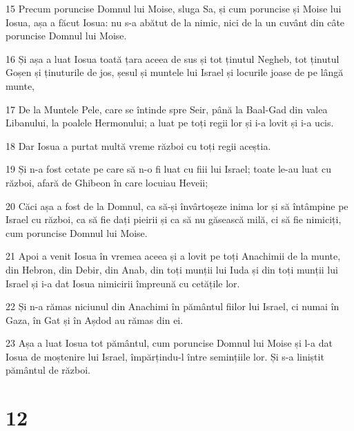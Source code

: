 \par 15 Precum poruncise Domnul lui Moise, sluga Sa, și cum poruncise și Moise lui Iosua, așa a făcut Iosua: nu s-a abătut de la nimic, nici de la un cuvânt din câte poruncise Domnul lui Moise.
\par 16 Și așa a luat Iosua toată țara aceea de sus și tot ținutul Negheb, tot ținutul Goșen și ținuturile de jos, șesul și muntele lui Israel și locurile joase de pe lângă munte,
\par 17 De la Muntele Pele, care se întinde spre Seir, până la Baal-Gad din valea Libanului, la poalele Hermonului; a luat pe toți regii lor și i-a lovit și i-a ucis.
\par 18 Dar Iosua a purtat multă vreme război cu toți regii aceștia.
\par 19 Și n-a fost cetate pe care să n-o fi luat cu fiii lui Israel; toate le-au luat cu război, afară de Ghibeon în care locuiau Heveii;
\par 20 Căci așa a fost de la Domnul, ca să-și învârtoșeze inima lor și să întâmpine pe Israel cu război, ca să fie dați pieirii și ca să nu găsească milă, ci să fie nimiciți, cum poruncise Domnul lui Moise.
\par 21 Apoi a venit Iosua în vremea aceea și a lovit pe toți Anachimii de la munte, din Hebron, din Debir, din Anab, din toți munții lui Iuda și din toți munții lui Israel și i-a dat Iosua nimicirii împreună cu cetățile lor.
\par 22 Și n-a rămas niciunul din Anachimi în pământul fiilor lui Israel, ci numai în Gaza, în Gat și în Așdod au rămas din ei.
\par 23 Așa a luat Iosua tot pământul, cum poruncise Domnul lui Moise și l-a dat Iosua de moștenire lui Israel, împărțindu-l între semințiile lor. Și s-a liniștit pământul de război.

\chapter{12}

